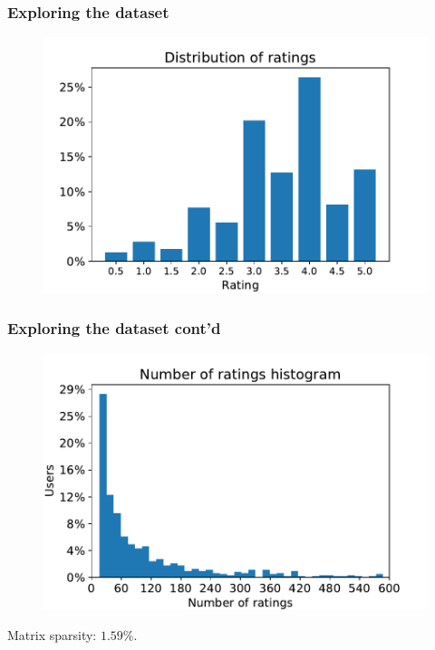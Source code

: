 \documentclass[xcolor = {table}]{beamer}
\begin{document}
  \begin{frame}
    \frametitle{Exploring the dataset}

    \begin{figure}
      \centering
      \includegraphics[width=1\linewidth]{img/ratings_dist.pdf}
    \end{figure}
    
  \end{frame}



  \begin{frame}
    \frametitle{Exploring the dataset cont'd}

    \begin{figure}
      \centering
      \includegraphics[width=0.9\linewidth]{img/n_ratings.pdf}
    \end{figure}

    Matrix sparsity: $1.59\%$. 

  \end{frame}
\end{document}
